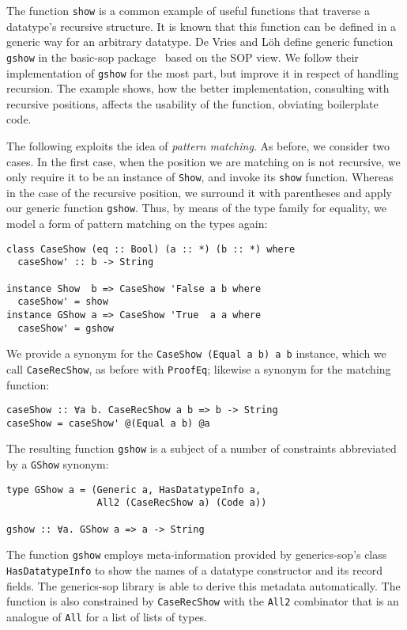 \documentclass[runningheads]{llncs}
\newcommand{\K}[1]{\lstinline{#1}}
\begin{document}
The function \K{show} is a common example of useful functions that traverse a datatype's recursive structure. It is known that this function can be defined in a generic way for an arbitrary datatype. De Vries and L\"{o}h define generic function \K{gshow} in the \textsf{basic-sop} package~\cite{basic-sop} based on the SOP view. We follow their implementation of \K{gshow} for the most part, but improve it in respect of handling recursion. The example shows, how the better implementation, consulting with recursive positions, affects the usability of the function, obviating boilerplate code.

The following exploits the idea of \emph{pattern matching}. As before, we consider two cases. In the first case, when the position we are matching on is not recursive, we only require it to be an  instance of \K{Show}, and invoke its \K{show} function. Whereas in the case of the recursive position, we surround it with parentheses and apply our generic function \K{gshow}. Thus, by means of the type family for equality, we model a form of pattern matching on the types again:
\begin{lstlisting}
class CaseShow (eq :: Bool) (a :: *) (b :: *) where
  caseShow' :: b -> String

instance Show  b => CaseShow 'False a b where
  caseShow' = show
instance GShow a => CaseShow 'True  a a where
  caseShow' = gshow
\end{lstlisting}
We provide a synonym for the \K{CaseShow (Equal a b) a b} instance, which we call \K{CaseRecShow}, as before with \K{ProofEq}; likewise a synonym for the matching function:
\begin{lstlisting}
caseShow :: ∀a b. CaseRecShow a b => b -> String
caseShow = caseShow' @(Equal a b) @a
\end{lstlisting}

The resulting function \K{gshow} is a subject of a number of constraints abbreviated by a \K{GShow} synonym:
\begin{lstlisting}
type GShow a = (Generic a, HasDatatypeInfo a,
                All2 (CaseRecShow a) (Code a))

gshow :: ∀a. GShow a => a -> String
\end{lstlisting}
The function \K{gshow} employs meta-information provided by \textsf{generics-sop}'s class \K{HasDatatypeInfo} to show the names of a datatype constructor and its record fields. The \textsf{generics-sop} library is able to derive this metadata automatically.
The function is also constrained by \K{CaseRecShow} with the \K{All2} combinator that is an analogue of \K{All} for a list of lists of types. 
\end{document}
